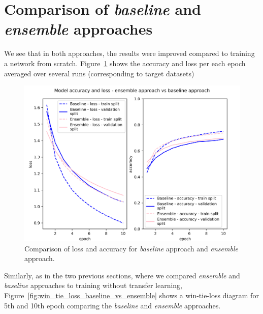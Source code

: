 \documentclass[a4paper,11pt,twoside]{report}
\theoremstyle{definition}
\begin{document}
\section{Comparison of\textit{ baseline }and\textit{ ensemble }approaches}
We see that in both approaches, the results were improved compared to training a network from scratch. Figure~\ref{fig:baseline_vs_ensemble} shows the accuracy and loss per each epoch averaged over several runs (corresponding to target datasets)

\FloatBarrier
\begin{figure}[h!t]
\centering
\includegraphics[width=15.5cm]{imgs/baseline_vs_ensemble/loss_acc.png}
\caption{Comparison of loss and accuracy for\textit{ baseline }approach and\textit{ ensemble }approach. }
\label{fig:baseline_vs_ensemble}
\end{figure}
\FloatBarrier
Similarly, as in the two previous sections, where we compared \textit{ensemble} and \textit{baseline} approaches to training without transfer learning, Figure~\ref{fig:win_tie_loss_baseline_vs_ensemble} shows a win-tie-loss diagram for 5th and 10th epoch comparing the \textit{baseline} and \textit{ensemble} approaches.
\end{document}
